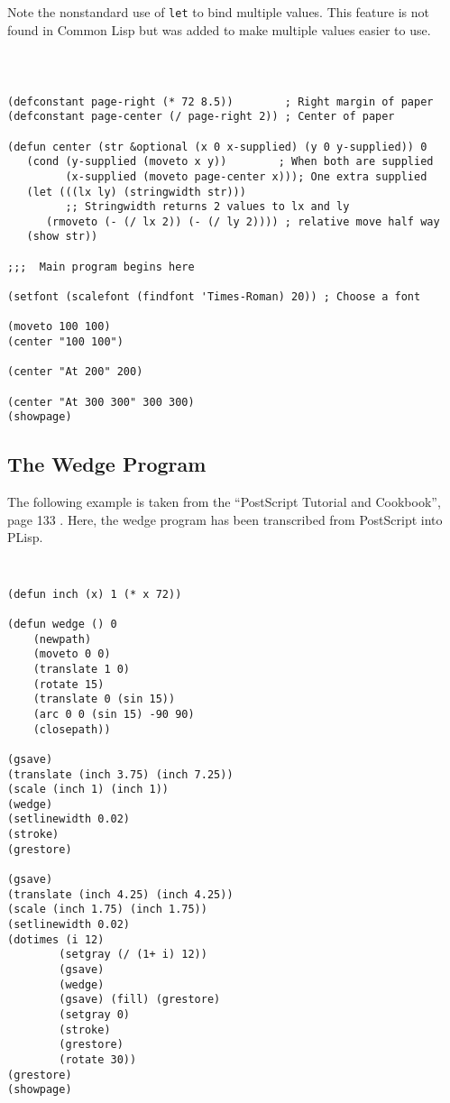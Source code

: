 Note the nonstandard use of {\tt let} to bind multiple values.  This feature
is not found in Common Lisp but was added to make multiple values
easier to use.

{\tt
\begin{verbatim}

(defconstant page-right (* 72 8.5))        ; Right margin of paper
(defconstant page-center (/ page-right 2)) ; Center of paper

(defun center (str &optional (x 0 x-supplied) (y 0 y-supplied)) 0
   (cond (y-supplied (moveto x y))        ; When both are supplied
         (x-supplied (moveto page-center x))); One extra supplied
   (let (((lx ly) (stringwidth str)))
         ;; Stringwidth returns 2 values to lx and ly 
      (rmoveto (- (/ lx 2)) (- (/ ly 2)))) ; relative move half way
   (show str))

;;;  Main program begins here

(setfont (scalefont (findfont 'Times-Roman) 20)) ; Choose a font

(moveto 100 100)
(center "100 100")

(center "At 200" 200)

(center "At 300 300" 300 300)
(showpage)

\end{verbatim}
}

\subsection{The Wedge Program}
The following example is taken from the ``PostScript Tutorial and
Cookbook'', page 133 \cite{cook}.
Here, the wedge program has been transcribed from PostScript
into PLisp.  
{\tt
\begin{verbatim}
(defun inch (x) 1 (* x 72))

(defun wedge () 0
    (newpath)
    (moveto 0 0)
    (translate 1 0)
    (rotate 15)
    (translate 0 (sin 15))
    (arc 0 0 (sin 15) -90 90)
    (closepath))

(gsave)
(translate (inch 3.75) (inch 7.25))
(scale (inch 1) (inch 1))
(wedge)
(setlinewidth 0.02)
(stroke)
(grestore)

(gsave)
(translate (inch 4.25) (inch 4.25))
(scale (inch 1.75) (inch 1.75))
(setlinewidth 0.02)
(dotimes (i 12)
        (setgray (/ (1+ i) 12))
        (gsave)
        (wedge)
        (gsave) (fill) (grestore)
        (setgray 0)
        (stroke)
        (grestore)
        (rotate 30))
(grestore)
(showpage)

\end{verbatim}
}

